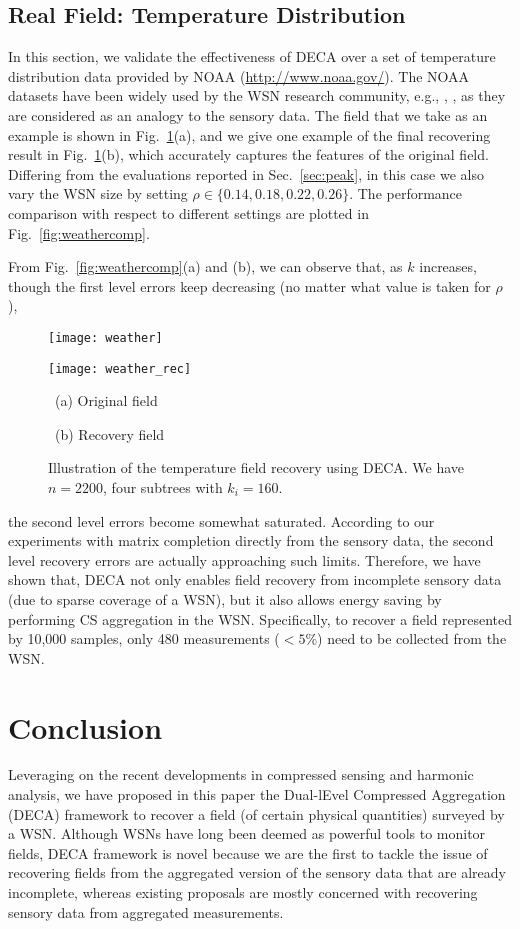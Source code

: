 \documentclass[conference]{IEEEtran}
\begin{document}
  \subsection{Real Field: Temperature Distribution}
In this section, we validate the effectiveness of DECA over a set of temperature distribution data provided by NOAA (\url{http://www.noaa.gov/}). The NOAA datasets have been widely used by the WSN research community, e.g., \cite{Gupta-ToSN08}, \cite{LuoWSC-MobiCom09}, as they are considered as an analogy to the sensory data. The field that we take as an example is shown in Fig.~\ref{fig:weatherillu}(a), and we give one example of the final recovering result in Fig.~\ref{fig:weatherillu}(b), which accurately captures the features of the original field. Differing from the evaluations reported in Sec.~\ref{sec:peak}, in this case we also vary the WSN size by setting $\rho\in\{0.14,0.18,0.22,0.26\}$. The performance comparison with respect to different settings are plotted in Fig.~\ref{fig:weathercomp}.

    From Fig.~\ref{fig:weathercomp}(a) and (b), we can observe that, as $k$ increases, though the first level errors keep decreasing (no matter what value is taken for $\rho$),
    \begin{figure}[t]
      \begin{center}
\parbox{.49\columnwidth}{\center \texttt{[image: weather]}}
        \parbox{.49\columnwidth}{\center \texttt{[image: weather\_rec]}}
        \parbox{.49\columnwidth}{\center\scriptsize~(a) Original field}
        \parbox{.49\columnwidth}{\center\scriptsize~(b) Recovery field}
        \caption{Illustration of the temperature field recovery using DECA. We have $n = 2200$, four subtrees with $k_i = 160$.}
        \label{fig:weatherillu}
      \end{center}
\end{figure}
the second level errors become somewhat saturated. According to our experiments with matrix completion directly from the sensory data, the second level recovery errors are actually approaching such limits. Therefore, we have shown that, DECA not only enables field recovery from incomplete sensory data (due to sparse coverage of a WSN), but it also allows energy saving by performing CS aggregation in the WSN. Specifically, to recover a field represented by 10,000 samples, only 480 measurements ($<5\%$) need to be collected from the WSN.


\section{Conclusion} \label{sec:con}
Leveraging on the recent developments in compressed sensing and harmonic analysis, we have proposed in this paper the Dual-lEvel Compressed Aggregation (DECA) framework to recover a field (of certain physical quantities) surveyed by a WSN. Although WSNs have long been deemed as powerful tools to monitor fields, DECA framework is novel because we are the first to tackle the issue of recovering fields from the aggregated version of the sensory data that are already incomplete, whereas existing proposals are mostly concerned with recovering sensory data from aggregated measurements.
\end{document}
